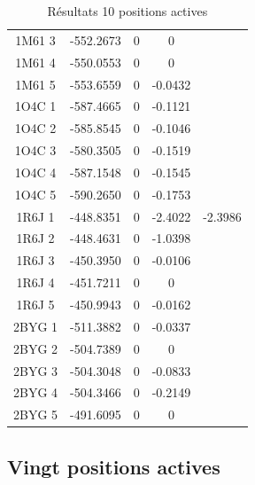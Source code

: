 \documentclass[a4paper,12pt]{article}
\begin{document}
\begin{table}[h]
\begin{tabular}{|c|c|c|c|c|}
        1M61 3 & -552.2673 & 0 & 0 & \\
        1M61 4 & -550.0553 & 0 & 0 & \\
        1M61 5 & -553.6559 & 0 & -0.0432 & \\
        1O4C 1 & -587.4665 & 0 & -0.1121 & \\
        1O4C 2 & -585.8545 & 0 & -0.1046 & \\
        1O4C 3 & -580.3505 & 0 & -0.1519 & \\
        1O4C 4 & -587.1548 & 0 & -0.1545 & \\
        1O4C 5 & -590.2650 & 0 & -0.1753 & \\
        1R6J 1 & -448.8351 & 0 & -2.4022 & -2.3986 \\
        1R6J 2 & -448.4631 & 0 & -1.0398 & \\
        1R6J 3 & -450.3950 & 0 & -0.0106 & \\
        1R6J 4 & -451.7211 & 0 & 0 & \\
        1R6J 5 & -450.9943 & 0 & -0.0162 & \\
        2BYG 1 & -511.3882 & 0 & -0.0337 & \\
        2BYG 2 & -504.7389 & 0 & 0 & \\
        2BYG 3 & -504.3048 & 0 & -0.0833 & \\
        2BYG 4 & -504.3466 & 0 & -0.2149 & \\
        2BYG 5 & -491.6095 & 0 & 0 & \\
        
        \hline


 \end{tabular}      
 \caption{Résultats 10 positions actives }
 \label{tab_echec2BYG__1}      
\end{table}


   \subsection{ Vingt positions actives}
\end{document}
